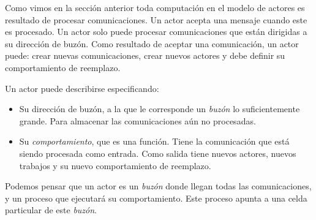 Como vimos en la sección anterior toda computación en el modelo de actores es resultado de procesar comunicaciones. Un actor acepta una mensaje cuando este es procesado. Un actor solo puede procesar comunicaciones que están dirigidas a su dirección de buzón. Como resultado de aceptar una comunicación, un actor puede: crear nuevas comunicaciones, crear nuevos actores y debe definir su comportamiento de reemplazo.


Un actor puede describirse especificando:

\begin{itemize}
 \item Su dirección de buzón, a la que le corresponde un \textit{buzón} lo suficientemente grande. Para almacenar las comunicaciones aún no procesadas.
 \item Su \textit{comportamiento}, que es una función. Tiene la comunicación que está siendo procesada como entrada. Como salida tiene nuevos actores, nuevos trabajos y su nuevo comportamiento de reemplazo.
\end{itemize}

Podemos pensar que un actor es un \textit{buzón} donde llegan todas las comunicaciones, y un proceso que ejecutará su comportamiento. Este proceso apunta a una celda particular de este \textit{buzón}. 

% 
% 
% 
% 
% 
% 
% 
% 


